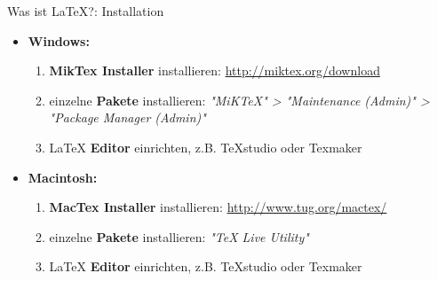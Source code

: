 \begin{frame}{Was ist \LaTeX?: Installation}
\begin{itemize}
\item \textbf{Windows:}
\begin{enumerate}
\item \textbf{MikTex Installer} installieren: \url{http://miktex.org/download}
\item einzelne \textbf{Pakete} installieren: \textit{"MiKTeX" > "Maintenance (Admin)" > "Package Manager (Admin)"}
\item \LaTeX{} \textbf{Editor} einrichten, z.B. TeXstudio oder Texmaker
\newline
\end{enumerate}
\item \textbf{Macintosh:}
\begin{enumerate}
\item \textbf{MacTex Installer} installieren: \url{http://www.tug.org/mactex/}
\item einzelne \textbf{Pakete} installieren: \textit{"TeX Live Utility"}
\item \LaTeX{} \textbf{Editor} einrichten, z.B. TeXstudio oder Texmaker
\end{enumerate}
\end{itemize}
\end{frame}


